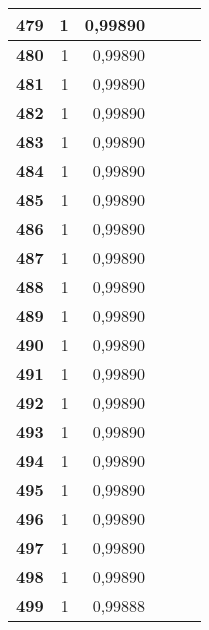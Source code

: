{\begin{longtable}{|r|r|r|l|r|r|}
\textbf{479} & 1 & 0,99890 &  & \multicolumn{1}{l|}{} & \multicolumn{1}{l|}{} \\ \hline
\textbf{480} & 1 & 0,99890 &  & \multicolumn{1}{l|}{} & \multicolumn{1}{l|}{} \\ \hline
\textbf{481} & 1 & 0,99890 &  & \multicolumn{1}{l|}{} & \multicolumn{1}{l|}{} \\ \hline
\textbf{482} & 1 & 0,99890 &  & \multicolumn{1}{l|}{} & \multicolumn{1}{l|}{} \\ \hline
\textbf{483} & 1 & 0,99890 &  & \multicolumn{1}{l|}{} & \multicolumn{1}{l|}{} \\ \hline
\textbf{484} & 1 & 0,99890 &  & \multicolumn{1}{l|}{} & \multicolumn{1}{l|}{} \\ \hline
\textbf{485} & 1 & 0,99890 &  & \multicolumn{1}{l|}{} & \multicolumn{1}{l|}{} \\ \hline
\textbf{486} & 1 & 0,99890 &  & \multicolumn{1}{l|}{} & \multicolumn{1}{l|}{} \\ \hline
\textbf{487} & 1 & 0,99890 &  & \multicolumn{1}{l|}{} & \multicolumn{1}{l|}{} \\ \hline
\textbf{488} & 1 & 0,99890 &  & \multicolumn{1}{l|}{} & \multicolumn{1}{l|}{} \\ \hline
\textbf{489} & 1 & 0,99890 &  & \multicolumn{1}{l|}{} & \multicolumn{1}{l|}{} \\ \hline
\textbf{490} & 1 & 0,99890 &  & \multicolumn{1}{l|}{} & \multicolumn{1}{l|}{} \\ \hline
\textbf{491} & 1 & 0,99890 &  & \multicolumn{1}{l|}{} & \multicolumn{1}{l|}{} \\ \hline
\textbf{492} & 1 & 0,99890 &  & \multicolumn{1}{l|}{} & \multicolumn{1}{l|}{} \\ \hline
\textbf{493} & 1 & 0,99890 &  & \multicolumn{1}{l|}{} & \multicolumn{1}{l|}{} \\ \hline
\textbf{494} & 1 & 0,99890 &  & \multicolumn{1}{l|}{} & \multicolumn{1}{l|}{} \\ \hline
\textbf{495} & 1 & 0,99890 &  & \multicolumn{1}{l|}{} & \multicolumn{1}{l|}{} \\ \hline
\textbf{496} & 1 & 0,99890 &  & \multicolumn{1}{l|}{} & \multicolumn{1}{l|}{} \\ \hline
\textbf{497} & 1 & 0,99890 &  & \multicolumn{1}{l|}{} & \multicolumn{1}{l|}{} \\ \hline
\textbf{498} & 1 & 0,99890 &  & \multicolumn{1}{l|}{} & \multicolumn{1}{l|}{} \\ \hline
\textbf{499} & 1 & 0,99888 &  & \multicolumn{1}{l|}{} & \multicolumn{1}{l|}{} \\ \hline

\end{longtable}}
